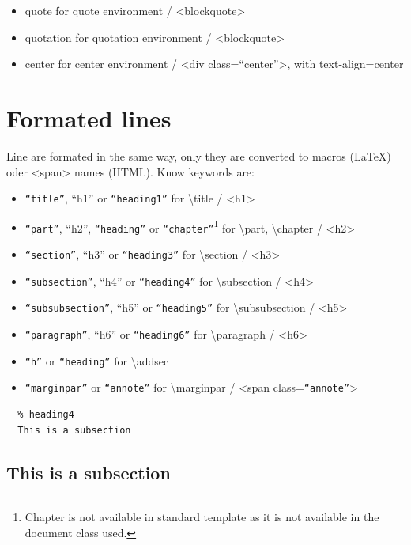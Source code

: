 \documentclass{article}
\begin{document}
\begin{itemize}
\item quote for quote environment / <blockquote>
\item quotation for quotation environment / <blockquote>
\item center for center environment / <div class=“center”>, with text-align=center
\end{itemize}


\section{Formated lines}
\label{form_lines}

{Line are formated in the same way, only they are converted
to macros (LaTeX) oder <span> names (HTML). Know keywords
are:\\}

\begin{itemize}
\item \texttt{“title”}, “h1” or \texttt{“heading1”} for \textbackslash title / <h1>
\item \texttt{“part”}, “h2”, \texttt{“heading”} or \texttt{“chapter”}\footnote{Chapter is not available in standard template as it is not available in the document class used.}\xspace  for \textbackslash part, \textbackslash chapter / <h2>
\item \texttt{“section”}, “h3” or \texttt{“heading3”} for \textbackslash section / <h3>
\item \texttt{“subsection”}, “h4” or \texttt{“heading4”} for \textbackslash subsection / <h4>
\item \texttt{“subsubsection”}, “h5” or \texttt{“heading5”} for \textbackslash subsubsection / <h5>
\item \texttt{“paragraph”}, “h6” or \texttt{“heading6”} for \textbackslash paragraph / <h6>
\item \texttt{“h”} or \texttt{“heading”} for \textbackslash addsec
\item \texttt{“marginpar”} or \texttt{“annote”} for \textbackslash marginpar / <span class=\texttt{“annote”}>
\end{itemize}


\begin{verbatim}
  % heading4
  This is a subsection
\end{verbatim}


\subsection{This is a subsection}
\end{document}
